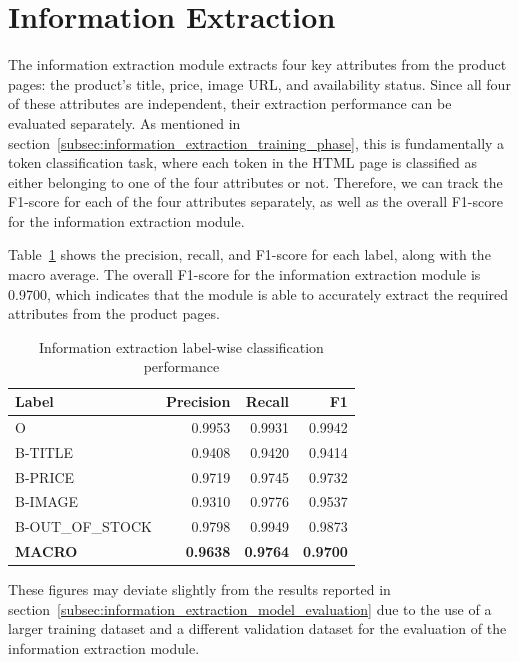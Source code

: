 \section{Information Extraction}\label{sec:information_extraction_evaluation}

The information extraction module extracts four key attributes from the product pages: the product's title, price, image URL, and availability status.
Since all four of these attributes are independent, their extraction performance can be evaluated separately.
As mentioned in section~\ref{subsec:information_extraction_training_phase}, this is fundamentally a token classification task, where each token in the HTML page is classified as either belonging to one of the four attributes or not.
Therefore, we can track the F1-score for each of the four attributes separately, as well as the overall F1-score for the information extraction module.

Table~\ref{tab:information-extraction-classification-report} shows the precision, recall, and F1-score for each label, along with the macro average.
The overall F1-score for the information extraction module is 0.9700, which indicates that the module is able to accurately extract the required attributes from the product pages.

\begin{table}[H]
    \centering
    \begin{tabular}{lrrr}
        \toprule
        \textbf{Label} & \textbf{Precision} & \textbf{Recall} & \textbf{F1} \\
        \midrule
        O & 0.9953 & 0.9931 & 0.9942 \\
        B-TITLE & 0.9408 & 0.9420 & 0.9414 \\
        B-PRICE & 0.9719 & 0.9745 & 0.9732 \\
        B-IMAGE & 0.9310 & 0.9776 & 0.9537 \\
        B-OUT\_OF\_STOCK & 0.9798 & 0.9949 & 0.9873 \\
        \midrule
        \textbf{MACRO} & \textbf{0.9638} & \textbf{0.9764} & \textbf{0.9700} \\
        \bottomrule
    \end{tabular}
    \caption{Information extraction label-wise classification performance}
    \label{tab:information-extraction-classification-report}
\end{table}

These figures may deviate slightly from the results reported in section~\ref{subsec:information_extraction_model_evaluation} due to the use of a larger training dataset and a different validation dataset for the evaluation of the information extraction module.

